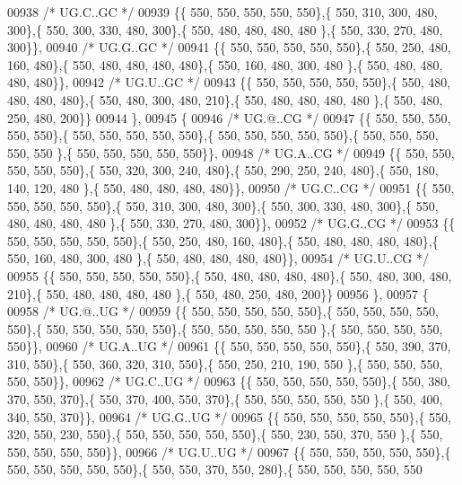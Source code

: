 \begin{DoxyCode}
00938 \textcolor{comment}{/* UG.C..GC */}
00939 \{\{ 550, 550, 550, 550, 550\},\{ 550, 310, 300, 480, 300\},\{ 550, 300, 330, 480, 300\},\{ 550, 480, 480, 480, 480
      \},\{ 550, 330, 270, 480, 300\}\},
00940 \textcolor{comment}{/* UG.G..GC */}
00941 \{\{ 550, 550, 550, 550, 550\},\{ 550, 250, 480, 160, 480\},\{ 550, 480, 480, 480, 480\},\{ 550, 160, 480, 300, 480
      \},\{ 550, 480, 480, 480, 480\}\},
00942 \textcolor{comment}{/* UG.U..GC */}
00943 \{\{ 550, 550, 550, 550, 550\},\{ 550, 480, 480, 480, 480\},\{ 550, 480, 300, 480, 210\},\{ 550, 480, 480, 480, 480
      \},\{ 550, 480, 250, 480, 200\}\}
00944 \},
00945 \{
00946 \textcolor{comment}{/* UG.@..CG */}
00947 \{\{ 550, 550, 550, 550, 550\},\{ 550, 550, 550, 550, 550\},\{ 550, 550, 550, 550, 550\},\{ 550, 550, 550, 550, 550
      \},\{ 550, 550, 550, 550, 550\}\},
00948 \textcolor{comment}{/* UG.A..CG */}
00949 \{\{ 550, 550, 550, 550, 550\},\{ 550, 320, 300, 240, 480\},\{ 550, 290, 250, 240, 480\},\{ 550, 180, 140, 120, 480
      \},\{ 550, 480, 480, 480, 480\}\},
00950 \textcolor{comment}{/* UG.C..CG */}
00951 \{\{ 550, 550, 550, 550, 550\},\{ 550, 310, 300, 480, 300\},\{ 550, 300, 330, 480, 300\},\{ 550, 480, 480, 480, 480
      \},\{ 550, 330, 270, 480, 300\}\},
00952 \textcolor{comment}{/* UG.G..CG */}
00953 \{\{ 550, 550, 550, 550, 550\},\{ 550, 250, 480, 160, 480\},\{ 550, 480, 480, 480, 480\},\{ 550, 160, 480, 300, 480
      \},\{ 550, 480, 480, 480, 480\}\},
00954 \textcolor{comment}{/* UG.U..CG */}
00955 \{\{ 550, 550, 550, 550, 550\},\{ 550, 480, 480, 480, 480\},\{ 550, 480, 300, 480, 210\},\{ 550, 480, 480, 480, 480
      \},\{ 550, 480, 250, 480, 200\}\}
00956 \},
00957 \{
00958 \textcolor{comment}{/* UG.@..UG */}
00959 \{\{ 550, 550, 550, 550, 550\},\{ 550, 550, 550, 550, 550\},\{ 550, 550, 550, 550, 550\},\{ 550, 550, 550, 550, 550
      \},\{ 550, 550, 550, 550, 550\}\},
00960 \textcolor{comment}{/* UG.A..UG */}
00961 \{\{ 550, 550, 550, 550, 550\},\{ 550, 390, 370, 310, 550\},\{ 550, 360, 320, 310, 550\},\{ 550, 250, 210, 190, 550
      \},\{ 550, 550, 550, 550, 550\}\},
00962 \textcolor{comment}{/* UG.C..UG */}
00963 \{\{ 550, 550, 550, 550, 550\},\{ 550, 380, 370, 550, 370\},\{ 550, 370, 400, 550, 370\},\{ 550, 550, 550, 550, 550
      \},\{ 550, 400, 340, 550, 370\}\},
00964 \textcolor{comment}{/* UG.G..UG */}
00965 \{\{ 550, 550, 550, 550, 550\},\{ 550, 320, 550, 230, 550\},\{ 550, 550, 550, 550, 550\},\{ 550, 230, 550, 370, 550
      \},\{ 550, 550, 550, 550, 550\}\},
00966 \textcolor{comment}{/* UG.U..UG */}
00967 \{\{ 550, 550, 550, 550, 550\},\{ 550, 550, 550, 550, 550\},\{ 550, 550, 370, 550, 280\},\{ 550, 550, 550, 550, 550

\end{DoxyCode}
